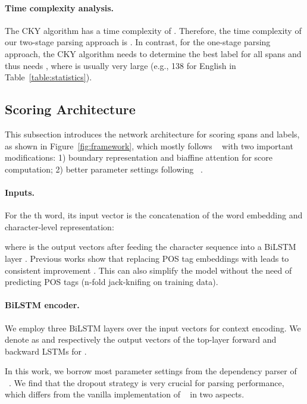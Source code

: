 \documentclass{article}
\begin{document}
\paragraph{Time complexity analysis.}
The CKY algorithm has a time complexity of . Therefore, the time complexity of our two-stage parsing approach is .
In contrast, for the one-stage parsing approach, the CKY algorithm needs to determine the best label for all  spans and thus needs
, where  is usually very large (e.g., 138 for English in Table~\ref{table:statistics}).





\subsection{Scoring Architecture}

This subsection introduces the network architecture for scoring spans and labels, as shown in Figure~\ref{fig:framework}, which
mostly follows \citeauthor{stern-etal-2017-minimal}~ with two important modifications: 1) boundary representation and biaffine attention for score computation; 2) better parameter settings following \citeauthor{Timothy-d17-biaffine}~.


\paragraph{Inputs.}
For the th word, its input vector  is the concatenation of the word embedding and character-level representation:

where
 is the output vectors after feeding the character sequence into a BiLSTM layer \cite{lample-etal-2016-neural}.
Previous works show that replacing POS tag embeddings with  leads to consistent improvement \cite{kitaev-klein-2018-constituency}.
This can also simplify the model without the need of predicting POS tags (n-fold jack-knifing on training data).


\paragraph{BiLSTM encoder.}
We employ three BiLSTM layers over the input vectors for context encoding.
We denote as  and  respectively the output vectors of the top-layer forward and backward LSTMs for .



In this work, we borrow most parameter settings from the dependency parser of \citeauthor{Timothy-d17-biaffine}~. We find that the dropout strategy is very crucial for parsing performance,
which differs from the vanilla implementation of \citeauthor{stern-etal-2017-minimal}~ in two aspects.
\end{document}

